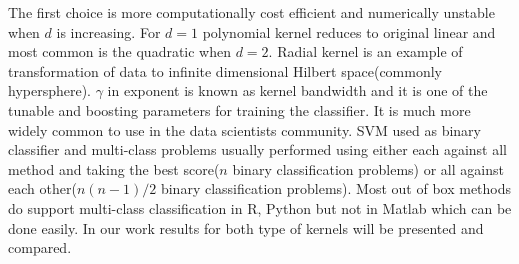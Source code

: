 The first choice is more computationally cost efficient and numerically unstable when $d$ is increasing. For $d=1$ polynomial kernel reduces to original linear and most common is the quadratic when $d=2$. Radial kernel is an example of transformation of data to infinite dimensional Hilbert space(commonly hypersphere). $\gamma$ in exponent is known as kernel bandwidth and it is one of the tunable and boosting parameters for training the classifier. It is much more widely common to use in the data scientists community. SVM used as binary classifier and multi-class problems usually performed using either each against all method and taking the best score($n$ binary classification problems) or all against each other($n(n-1)/2$ binary classification problems). Most out of box methods do support multi-class classification in R, Python but not in Matlab which can be done easily.  In our work results for both type of kernels will be presented and compared.           
\clearpage
